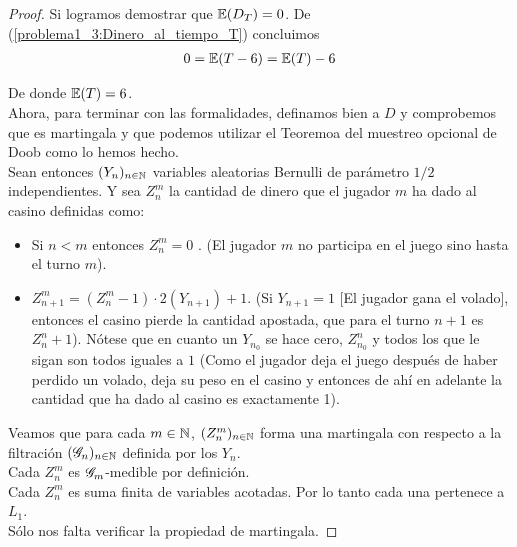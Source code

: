 \begin{proof}
		Si logramos demostrar que $\mathbb{E}(D_T) = 0$. De (\ref{problema1_3:Dinero_al_tiempo_T}) concluimos
		\begin{align}
			0 = \mathbb{E}(T - 6) = \mathbb{E}(T) - 6
		\end{align}
		
		De donde $\mathbb{E}(T) = 6$.\\
		
		Ahora, para terminar con las formalidades, definamos bien a $D$ y comprobemos que es martingala y 
		que podemos utilizar el Teoremoa del muestreo opcional de Doob como lo hemos hecho.\\
		
		Sean entonces $(Y_n)_{n \in \mathbb{N}}$ variables aleatorias Bernulli de parámetro $1/2$ independientes.
		Y sea $Z_n^m$ la cantidad de dinero que el jugador $m$ ha dado al casino definidas como:
		
		\begin{itemize}
			\item 
				Si $n < m$ entonces $Z_n^m = 0$ . (El jugador $m$ no participa en el juego sino hasta el turno $m$).
			\item
				$Z_{n+1}^{m} = (Z_n^{m} - 1) \cdot 2(Y_{n+1}) + 1$. (Si $Y_{n + 1} = 1$ [El jugador gana el volado], entonces el casino
				pierde la cantidad apostada, que para el turno $n+1$ es $Z_n^n + 1$). Nótese que en cuanto un $Y_{n_0}$ se hace cero,
				$Z_{n_0}^{n}$ y todos los que le sigan son todos iguales a $1$ (Como el jugador deja el juego después de haber perdido
				un volado, deja su peso en el casino y entonces de ahí en adelante la cantidad que ha dado al casino es exactamente 1).
		\end{itemize}
		
		Veamos que para cada $m \in \mathbb{N}$, $(Z_n^m)_{n \in \mathbb{N}}$ forma una martingala con respecto a la filtración $(\mathscr{G}_n)_{n \in \mathbb{N}}$ 
		definida por los $Y_n$.\\
		
		Cada $Z_n^m$ es $\mathscr{G}_m$-medible por definición.\\
		
		Cada $Z_n^m$ es suma finita de variables acotadas. Por lo tanto cada una pertenece a $L_1$.\\
		
		Sólo nos falta verificar la propiedad de martingala.
		

\end{proof}
